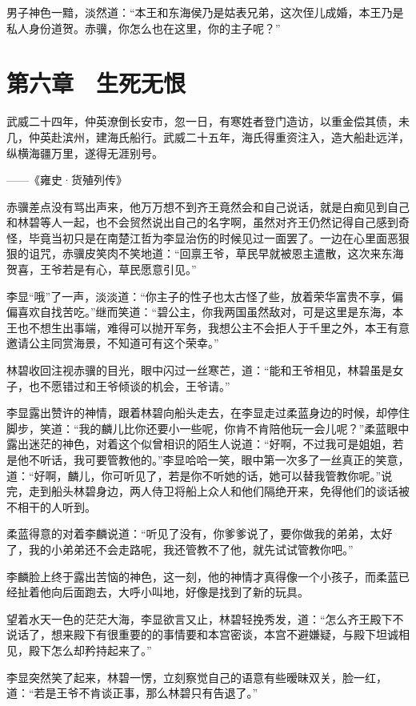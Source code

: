 男子神色一黯，淡然道：“本王和东海侯乃是姑表兄弟，这次侄儿成婚，本王乃是私人身份道贺。赤骥，你怎么也在这里，你的主子呢？”

\chapter{第六章　生死无恨}

武威二十四年，仲英潦倒长安市，忽一日，有寒姓者登门造访，以重金偿其债，未几，仲英赴滨州，建海氏船行。武威二十五年，海氏得重资注入，造大船赴远洋，纵横海疆万里，遂得无涯别号。

——《雍史·货殖列传》

赤骥差点没有骂出声来，他万万想不到齐王竟然会和自己说话，就是白痴见到自己和林碧等人一起，也不会贸然说出自己的名字啊，虽然对齐王仍然记得自己感到奇怪，毕竟当初只是在南楚江哲为李显治伤的时候见过一面罢了。一边在心里面恶狠狠的诅咒，赤骥皮笑肉不笑地道：“回禀王爷，草民早就被恩主遣散，这次来东海贺喜，王爷若是有心，草民愿意引见。”

李显“哦”了一声，淡淡道：“你主子的性子也太古怪了些，放着荣华富贵不享，偏偏喜欢自找苦吃。”继而笑道：“碧公主，你我两国虽然敌对，可是这里是东海，本王也不想生出事端，难得可以抛开军务，我想公主不会拒人于千里之外，本王有意邀请公主同赏海景，不知道可有这个荣幸。”

林碧收回注视赤骥的目光，眼中闪过一丝寒芒，道：“能和王爷相见，林碧虽是女子，也不愿错过和王爷倾谈的机会，王爷请。”

李显露出赞许的神情，跟着林碧向船头走去，在李显走过柔蓝身边的时候，却停住脚步，笑道：“我的麟儿比你还要小一些呢，你肯不肯陪他玩一会儿呢？”柔蓝眼中露出迷茫的神色，对着这个似曾相识的陌生人说道：“好啊，不过我可是姐姐，若是他不听话，我可要管教他的。”李显哈哈一笑，眼中第一次多了一丝真正的笑意，道：“好啊，麟儿，你可听见了，若是你不听她的话，她可以替我管教你呢。”说完，走到船头林碧身边，两人侍卫将船上众人和他们隔绝开来，免得他们的谈话被不相干的人听到。

柔蓝得意的对着李麟说道：“听见了没有，你爹爹说了，要你做我的弟弟，太好了，我的小弟弟还不会走路呢，我还管教不了他，就先试试管教你吧。”

李麟脸上终于露出苦恼的神色，这一刻，他的神情才真得像一个小孩子，而柔蓝已经扯着他向后面跑去，大呼小叫地，好像是找到了新的玩具。

望着水天一色的茫茫大海，李显欲言又止，林碧轻挽秀发，道：“怎么齐王殿下不说话了，想来殿下有很重要的的事情要和本宫密谈，本宫不避嫌疑，与殿下坦诚相见，殿下怎么却矜持起来了。”

李显突然笑了起来，林碧一愣，立刻察觉自己的语意有些暧昧双关，脸一红，道：“若是王爷不肯谈正事，那么林碧只有告退了。”

